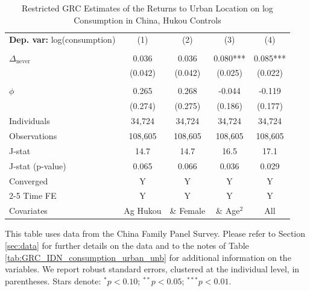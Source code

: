 \begin{table}[htbp] \centering \begin{threeparttable}
 \caption{Restricted GRC Estimates of the Returns to Urban Location on log Consumption in China, Hukou Controls} 
 \label{tab:GRC_CHN_hctrl_consumption_urban_unb} 
\begin{tabular}{l cccc} \toprule  \textbf{Dep. var:}  log(consumption) 
                    &\multicolumn{1}{c}{(1)}   &\multicolumn{1}{c}{(2)}   &\multicolumn{1}{c}{(3)}   &\multicolumn{1}{c}{(4)}   \\
                    &               &               &               &               \\
\addlinespace
$\Delta_{\text{never}}$&       0.036   &       0.036   &       0.080***&       0.085***\\
                    &     (0.042)   &     (0.042)   &     (0.025)   &     (0.022)   \\
                    &               &               &               &               \\
\addlinespace
$\phi$              &       0.265   &       0.268   &      -0.044   &      -0.119   \\
                    &     (0.274)   &     (0.275)   &     (0.186)   &     (0.177)   \\
\addlinespace
Individuals         &      34,724   &      34,724   &      34,724   &      34,724   \\
Observations        &     108,605   &     108,605   &     108,605   &     108,605   \\
J-stat              &        14.7   &        14.7   &        16.5   &        17.1   \\
J-stat (p-value)    &       0.065   &       0.066   &       0.036   &       0.029   \\
Converged           &           Y   &           Y   &           Y   &           Y   \\
\cmidrule{2-5} Time FE & Y & Y & Y & Y \\ Covariates & Ag Hukou & \& Female & \& Age$^2$ & All \\ \bottomrule \end{tabular} \begin{tablenotes}[flushleft] \footnotesize \item{This table uses data from the China Family Panel Survey. Please refer to Section \ref{sec:data} for further details on the data and to the notes of Table \ref{tab:GRC_IDN_consumption_urban_unb} for additional information on the variables. We report robust standard errors, clustered at the individual level, in parentheses. Stars denote: $^{*} p<0.10$; $^{**} p<0.05$; $^{***} p<0.01$.} \end{tablenotes} \end{threeparttable} \end{table}
